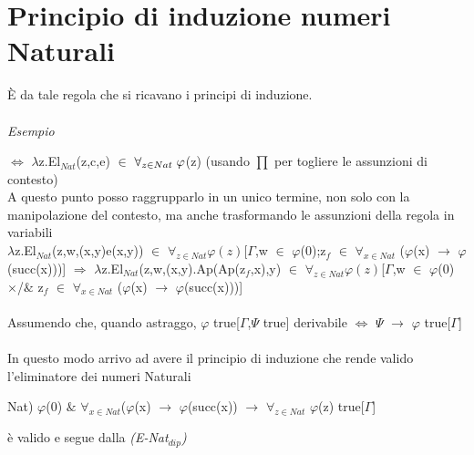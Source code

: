 \section{Principio di induzione numeri Naturali}
\label{sec:principio-di-induzione-numeri-Naturali}
\begin{prooftree}
\end{prooftree}
\noindent
\`E da tale regola che si ricavano i principi di induzione.\\\\
\noindent
\textit{Esempio}
\begin{prooftree}
\end{prooftree}
\noindent
$\Leftrightarrow$ $\lambda$z.El$_{Nat}$(z,c,e) $\in$ $\forall_{z \in Nat} \hspace{0.1cm}\varphi$(z) (usando {\scriptsize $\prod$} per togliere le assunzioni di contesto)\\
A questo punto posso raggrupparlo in un unico termine, non solo con la manipolazione del contesto, ma anche trasformando le assunzioni della regola in variabili\\
$\lambda$z.El$_{Nat}$(z,w,(x,y)e(x,y)) $\in$ $\forall_{z \in Nat} \varphi(z)$[$\Gamma$,w $\in$ $\varphi$(0);z$_f$ $\in$ $\forall_{x \in Nat}$ ($\varphi$(x) $\rightarrow$ $\varphi$(succ(x)))] $\Rightarrow$
$\lambda$z.El$_{Nat}$(z,w,(x,y).Ap(Ap(z$_f$,x),y) $\in$ $\forall_{z \in Nat} \varphi(z)$[$\Gamma$,w $\in$ $\varphi$(0) $\times$/$\&$ z$_f$ $\in$ $\forall_{x \in Nat}$ ($\varphi$(x) $\rightarrow$ $\varphi$(succ(x)))]\\\\
\noindent
Assumendo che, quando astraggo, $\varphi$ true[$\Gamma$,$\Psi$ true] derivabile $\Leftrightarrow$ $\Psi$ $\rightarrow$ $\varphi$ true[$\Gamma$]\\\\
\noindent
In questo modo arrivo ad avere il principio di induzione che rende valido l'eliminatore dei numeri Naturali\\
\begin{center}Nat) $\varphi$(0) $\&$ $\forall_{x \in Nat}$($\varphi$(x) $\rightarrow$ $\varphi$(succ(x)) $\rightarrow$ $\forall_{z \in Nat}$ $\varphi$(z) true[$\Gamma$]\end{center}
\`e valido e segue dalla \textit{(E-Nat$_{dip}$)}

